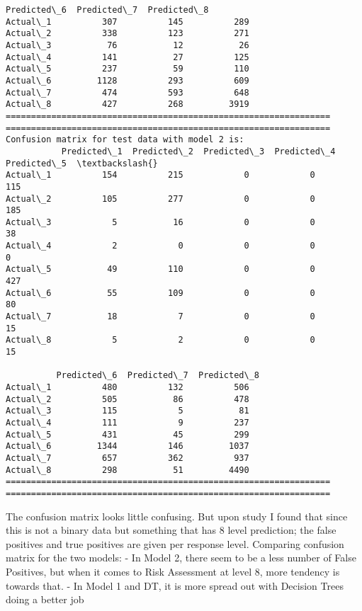 \documentclass[11pt]{article}
\begin{document}
\begin{Verbatim}[commandchars=\\\{\}]
          Predicted\_6  Predicted\_7  Predicted\_8  
Actual\_1          307          145          289  
Actual\_2          338          123          271  
Actual\_3           76           12           26  
Actual\_4          141           27          125  
Actual\_5          237           59          110  
Actual\_6         1128          293          609  
Actual\_7          474          593          648  
Actual\_8          427          268         3919  
================================================================
================================================================
Confusion matrix for test data with model 2 is:
           Predicted\_1  Predicted\_2  Predicted\_3  Predicted\_4  Predicted\_5  \textbackslash{}
Actual\_1          154          215            0            0          115   
Actual\_2          105          277            0            0          185   
Actual\_3            5           16            0            0           38   
Actual\_4            2            0            0            0            0   
Actual\_5           49          110            0            0          427   
Actual\_6           55          109            0            0           80   
Actual\_7           18            7            0            0           15   
Actual\_8            5            2            0            0           15   

          Predicted\_6  Predicted\_7  Predicted\_8  
Actual\_1          480          132          506  
Actual\_2          505           86          478  
Actual\_3          115            5           81  
Actual\_4          111            9          237  
Actual\_5          431           45          299  
Actual\_6         1344          146         1037  
Actual\_7          657          362          937  
Actual\_8          298           51         4490  
================================================================
================================================================

    \end{Verbatim}

    The confusion matrix looks little confusing. But upon study I found that
since this is not a binary data but something that has 8 level
prediction; the false positives and true positives are given per
response level. Comparing confusion matrix for the two models: - In
Model 2, there seem to be a less number of False Positives, but when it
comes to Risk Assessment at level 8, more tendency is towards that. - In
Model 1 and DT, it is more spread out with Decision Trees doing a better
job
\end{document}

